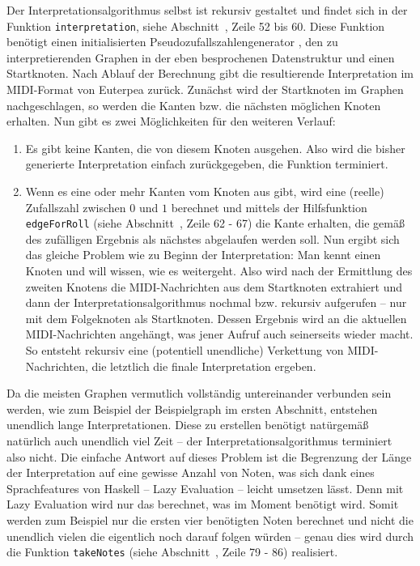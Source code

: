 \documentclass[a4paper,twocolumn]{article}
\begin{document}
Der Interpretationsalgorithmus selbst ist rekursiv \cite{wikipedia_rekursion} gestaltet und findet sich in
der Funktion \lstinline[basicstyle=\ttfamily]|interpretation|, siehe
Abschnitt~, Zeile 52 bis 60. Diese Funktion benötigt
einen initialisierten Pseudozufallszahlengenerator
\cite{random_random_gen,wikipedia_prng}, den
zu interpretierenden Graphen in der eben besprochenen Datenstruktur und einen
Startknoten. Nach Ablauf der Berechnung gibt die resultierende Interpretation
im MIDI-Format von Euterpea \cite{euterpea} zurück. Zunächst wird der Startknoten
im Graphen nachgeschlagen, so werden die Kanten bzw. die nächsten möglichen Knoten
erhalten. Nun gibt es zwei Möglichkeiten für den weiteren Verlauf:
\begin{enumerate}
  \item Es gibt keine Kanten, die von diesem Knoten ausgehen. Also wird die
    bisher generierte Interpretation einfach zurückgegeben, die Funktion
    terminiert.
  \item Wenn es eine oder mehr Kanten vom Knoten aus gibt, wird eine (reelle) Zufallszahl
    zwischen $0$ und $1$ berechnet und mittels der Hilfsfunktion \lstinline[basicstyle=\ttfamily]|edgeForRoll|
    (siehe Abschnitt~, Zeile 62 - 67) die
    Kante erhalten, die gemäß des zufälligen Ergebnis als nächstes abgelaufen werden
    soll. Nun ergibt sich das gleiche Problem wie zu Beginn der
    Interpretation: Man kennt einen Knoten und will wissen, wie es weitergeht. Also
    wird nach der Ermittlung des zweiten Knotens die MIDI-Nachrichten aus dem
    Startknoten extrahiert und dann der Interpretationsalgorithmus nochmal bzw.
    rekursiv aufgerufen -- nur mit dem Folgeknoten als Startknoten. Dessen
    Ergebnis wird an die aktuellen MIDI-Nachrichten angehängt, was jener Aufruf auch
    seinerseits wieder macht. So entsteht rekursiv eine (potentiell unendliche)
    Verkettung von MIDI-Nachrichten, die letztlich die finale Interpretation ergeben.
\end{enumerate}

Da die meisten Graphen vermutlich vollständig untereinander verbunden sein
werden, wie zum Beispiel der Beispielgraph im ersten Abschnitt, entstehen unendlich
lange Interpretationen. Diese zu erstellen benötigt natürgemäß natürlich auch
unendlich viel Zeit -- der Interpretationsalgorithmus terminiert also nicht.
Die einfache Antwort auf dieses Problem ist die Begrenzung der Länge der
Interpretation auf eine gewisse Anzahl von Noten, was sich dank eines
Sprachfeatures von Haskell -- Lazy Evaluation \cite{wikipedia_laziness} --
leicht umsetzen lässt. Denn mit Lazy Evaluation wird nur das berechnet, was im
Moment benötigt wird. Somit werden zum Beispiel nur die ersten vier benötigten
Noten berechnet und nicht die unendlich vielen die eigentlich noch darauf folgen
würden -- genau dies wird durch die Funktion
\lstinline[basicstyle=\ttfamily]|takeNotes| (siehe
Abschnitt~, Zeile 79 - 86) realisiert.
\end{document}
